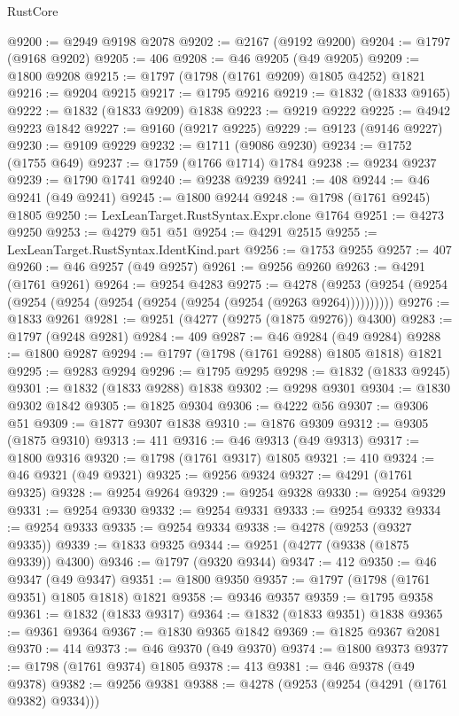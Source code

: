 \begin{lexlean}{RustCore}
\begin{coremodule}
@9200 := @2949 @9198 @2078
@9202 := @2167 (@9192 @9200)
@9204 := @1797 (@9168 @9202)
@9205 := 406
@9208 := @46 @9205 (@49 @9205)
@9209 := @1800 @9208
@9215 := @1797 (@1798 (@1761 @9209) @1805 @4252) @1821
@9216 := @9204 @9215
@9217 := @1795 @9216
@9219 := @1832 (@1833 @9165)
@9222 := @1832 (@1833 @9209) @1838
@9223 := @9219 @9222
@9225 := @4942 @9223 @1842
@9227 := @9160 (@9217 @9225)
@9229 := @9123 (@9146 @9227)
@9230 := @9109 @9229
@9232 := @1711 (@9086 @9230)
@9234 := @1752 (@1755 @649)
@9237 := @1759 (@1766 @1714) @1784
@9238 := @9234 @9237
@9239 := @1790 @1741
@9240 := @9238 @9239
@9241 := 408
@9244 := @46 @9241 (@49 @9241)
@9245 := @1800 @9244
@9248 := @1798 (@1761 @9245) @1805
@9250 := LexLeanTarget.RustSyntax.Expr.clone @1764
@9251 := @4273 @9250
@9253 := @4279 @51 @51
@9254 := @4291 @2515
@9255 := LexLeanTarget.RustSyntax.IdentKind.part
@9256 := @1753 @9255
@9257 := 407
@9260 := @46 @9257 (@49 @9257)
@9261 := @9256 @9260
@9263 := @4291 (@1761 @9261)
@9264 := @9254 @4283
@9275 := @4278 (@9253 (@9254 (@9254 (@9254 (@9254 (@9254 (@9254 (@9254 (@9254 (@9263 @9264))))))))))
@9276 := @1833 @9261
@9281 := @9251 (@4277 (@9275 (@1875 @9276)) @4300)
@9283 := @1797 (@9248 @9281)
@9284 := 409
@9287 := @46 @9284 (@49 @9284)
@9288 := @1800 @9287
@9294 := @1797 (@1798 (@1761 @9288) @1805 @1818) @1821
@9295 := @9283 @9294
@9296 := @1795 @9295
@9298 := @1832 (@1833 @9245)
@9301 := @1832 (@1833 @9288) @1838
@9302 := @9298 @9301
@9304 := @1830 @9302 @1842
@9305 := @1825 @9304
@9306 := @4222 @56
@9307 := @9306 @51
@9309 := @1877 @9307 @1838
@9310 := @1876 @9309
@9312 := @9305 (@1875 @9310)
@9313 := 411
@9316 := @46 @9313 (@49 @9313)
@9317 := @1800 @9316
@9320 := @1798 (@1761 @9317) @1805
@9321 := 410
@9324 := @46 @9321 (@49 @9321)
@9325 := @9256 @9324
@9327 := @4291 (@1761 @9325)
@9328 := @9254 @9264
@9329 := @9254 @9328
@9330 := @9254 @9329
@9331 := @9254 @9330
@9332 := @9254 @9331
@9333 := @9254 @9332
@9334 := @9254 @9333
@9335 := @9254 @9334
@9338 := @4278 (@9253 (@9327 @9335))
@9339 := @1833 @9325
@9344 := @9251 (@4277 (@9338 (@1875 @9339)) @4300)
@9346 := @1797 (@9320 @9344)
@9347 := 412
@9350 := @46 @9347 (@49 @9347)
@9351 := @1800 @9350
@9357 := @1797 (@1798 (@1761 @9351) @1805 @1818) @1821
@9358 := @9346 @9357
@9359 := @1795 @9358
@9361 := @1832 (@1833 @9317)
@9364 := @1832 (@1833 @9351) @1838
@9365 := @9361 @9364
@9367 := @1830 @9365 @1842
@9369 := @1825 @9367 @2081
@9370 := 414
@9373 := @46 @9370 (@49 @9370)
@9374 := @1800 @9373
@9377 := @1798 (@1761 @9374) @1805
@9378 := 413
@9381 := @46 @9378 (@49 @9378)
@9382 := @9256 @9381
@9388 := @4278 (@9253 (@9254 (@4291 (@1761 @9382) @9334)))

\end{coremodule}
\end{lexlean}
